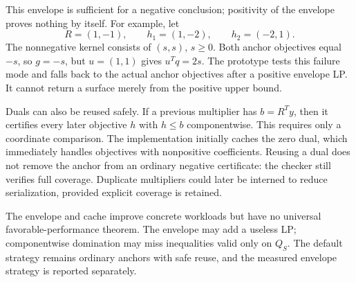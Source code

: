 This envelope is sufficient for a negative conclusion; positivity of the envelope proves nothing by itself. For example, let
\[
 R=(1,-1),\qquad h_1=(1,-2),\qquad h_2=(-2,1).
\]
The nonnegative kernel consists of $(s,s)$, $s\ge0$. Both anchor objectives equal $-s$, so $g=-s$, but $u=(1,1)$ gives $u^Tq=2s$. The prototype tests this failure mode and falls back to the actual anchor objectives after a positive envelope LP. It cannot return a surface merely from the positive upper bound.

Duals can also be reused safely. If a previous multiplier has $b=R^Ty$, then it certifies every later objective $h$ with $h\le b$ componentwise. This requires only a coordinate comparison. The implementation initially caches the zero dual, which immediately handles objectives with nonpositive coefficients. Reusing a dual does not remove the anchor from an ordinary negative certificate: the checker still verifies full coverage. Duplicate multipliers could later be interned to reduce serialization, provided explicit coverage is retained.

The envelope and cache improve concrete workloads but have no universal favorable-performance theorem. The envelope may add a useless LP; componentwise domination may miss inequalities valid only on $Q_S$. The default strategy remains ordinary anchors with safe reuse, and the measured envelope strategy is reported separately.
